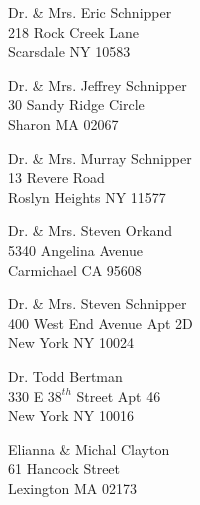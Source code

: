 \documentclass{article}
\begin{document}
\begin{center}
\begin{Huge}
\clearpage

\vspace*{\fill}
Dr. \& Mrs. Eric Schnipper\\
218 Rock Creek Lane\\
Scarsdale NY 10583\\
\vspace{\fill}

\clearpage

\vspace*{\fill}
Dr. \& Mrs. Jeffrey Schnipper\\
30 Sandy Ridge Circle\\
Sharon MA 02067\\
\vspace{\fill}

\clearpage

\vspace*{\fill}
Dr. \& Mrs. Murray Schnipper\\
13 Revere Road\\
Roslyn Heights NY 11577\\
\vspace{\fill}

\clearpage

\vspace*{\fill}
Dr. \& Mrs. Steven Orkand\\
5340 Angelina Avenue\\
Carmichael CA 95608\\
\vspace{\fill}

\clearpage

\vspace*{\fill}
Dr. \& Mrs. Steven Schnipper \\
400 West End Avenue Apt 2D\\
New York NY 10024\\
\vspace{\fill}

\clearpage

\vspace*{\fill}
Dr. Todd Bertman\\
330 E $38^{th}$ Street Apt 46\\
New York NY 10016\\
\vspace{\fill}

\clearpage

\vspace*{\fill}
Elianna \& Michal Clayton\\
61 Hancock Street\\
Lexington MA 02173\\
\vspace{\fill}


\end{Huge}
\end{center}
\end{document}
